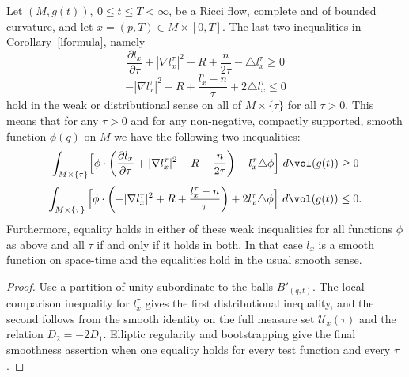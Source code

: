 \begin{theorem}
\label{thm:l-weak-inequalities}
\label{weak}
Let $(M,g(t)),\ 0\le t\le T<\infty$, be a Ricci flow, complete and
of bounded curvature, and let $x=(p,T)\in M\times[0,T]$. The last
two inequalities in Corollary~\ref{lformula}, namely
$$\frac{\partial l_x}{\partial \tau}+|\nabla l^\tau_x|^2-R+\frac{n}{2\tau}
- \triangle l^\tau_x\ge 0$$
$$-|\nabla l^\tau_x|^2+R+\frac{l^\tau_x-n}{\tau}+2\triangle l^\tau_x\le 0$$
hold in the weak or distributional sense on all of $M\times\{\tau\}$
for all $\tau>0$. This means that for any $\tau>0$ and for any
non-negative, compactly supported, smooth function $\phi(q)$ on $M$
we have the following two inequalities:
$$\int_{M\times \{\tau\}}\Bigl[ \phi\cdot\left(\frac{\partial l_x}{\partial \tau}+|\nabla
l_x^\tau|^2-R+\frac{n}{2\tau}\right) - l_x^\tau\triangle \phi\Bigr]\
d\vol(g(t))\ge 0$$
$$\int_{M\times \{\tau\}}\Big[ \phi\cdot\left(-|\nabla
l_x^\tau|^2+R+\frac{l_x^\tau-n}{\tau}\right)+2l^\tau_x\triangle
\phi\Bigr]\ d\vol(g(t))\le 0.$$ Furthermore, equality holds in
either of these weak inequalities for all functions $\phi$ as above
and all $\tau$ if and only if it holds in both. In that case $l_x$
is a smooth function on space-time and the equalities hold in the
usual smooth sense.
\end{theorem}
\begin{proof}\sketch
{}
Use a partition of unity subordinate to the balls $B'_{(q,t)}$. The local
comparison inequality for $l_x^\tau$ gives the first distributional
inequality, and the second follows from the smooth identity on the full
measure set ${\mathcal U}_x(\tau)$ and the relation $D_2=-2D_1$. Elliptic
regularity and bootstrapping give the final smoothness assertion when
one equality holds for every test function and every $\tau$.
\end{proof}








